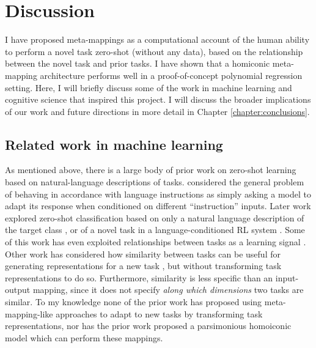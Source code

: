 \section{Discussion}\label{sec:HoMM:discussion}

I have proposed meta-mappings as a computational account of the human ability to perform a novel task zero-shot (without any data), based on the relationship between the novel task and prior tasks. I have shown that a homiconic meta-mapping architecture performs well in a proof-of-concept polynomial regression setting. Here, I will briefly discuss some of the work in machine learning and cognitive science that inspired this project. I will discuss the broader implications of our work and future directions in more detail in Chapter \ref{chapter:conclusions}. 

\subsection{Related work in machine learning}
As mentioned above, there is a large body of prior work on zero-shot learning based on natural-language descriptions of tasks. \citet{Larochelle2008} considered the general problem of behaving in accordance with language instructions as simply asking a model to adapt its response when conditioned on different ``instruction'' inputs. Later work explored zero-shot classification based on only a natural language description of the target class \citep{Socher2013,Romera-Paredes2015,Xian2018}, or of a novel task in a language-conditioned RL system \citep{Hermann2017, Hill2019a}. Some of this work has even exploited relationships between tasks as a learning signal \citep{Oh2017a}. Other work has considered how similarity between tasks can be useful for generating representations for a new task \citep{Pal2019}, but without transforming task representations to do so. Furthermore, similarity is less specific than an input-output mapping, since it does not specify \emph{along which dimensions} two tasks are similar. To my knowledge none of the prior work has proposed using meta-mapping-like approaches to adapt to new tasks by transforming task representations, nor has the prior work proposed a parsimonious homoiconic model which can perform these mappings.

